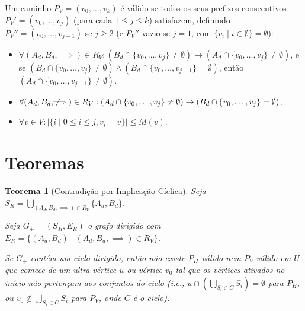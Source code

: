 \documentclass{article}
\newtheorem{theorem}{Teorema}
\begin{document}
Um caminho \( P_V = (v_0, \dots, v_k) \) é válido se todos os seus prefixos consecutivos \( P_V' = (v_0, \dots, v_j) \) (para cada \( 1 \leq j \leq k \)) satisfazem, definindo \( P_V'' = (v_0, \dots, v_{j-1}) \) se \( j \geq 2 \) (e \( P_V'' \) vazio se \( j = 1 \), com \( \{v_i \mid i \in \emptyset \} = \emptyset \)):

\begin{itemize}
    \item \( \forall (A_d, B_d, \implies) \in R_V: (B_d \cap \{v_0, \dots, v_j\} \neq \emptyset) \to (A_d \cap \{v_0, \dots, v_j\} \neq \emptyset) \), e se \( (B_d \cap \{v_0, \dots, v_j\} \neq \emptyset) \wedge (B_d \cap \{v_0, \dots, v_{j-1}\} = \emptyset) \), então \( (A_d \cap \{v_0, \dots, v_{j-1}\} \neq \emptyset) \).
    \item \( \forall (A_d, B_d, \not\!\!\!\implies) \in R_V: (A_d \cap \{v_0, \dots, v_j\} \neq \emptyset) \to (B_d \cap \{v_0, \dots, v_j\} = \emptyset) \).
    \item \( \forall v \in V: |\{ i \mid 0 \leq i \leq j, v_i = v \}| \leq M(v) \).
\end{itemize}

\section{Teoremas}

\begin{theorem}[Contradição por Implicação Cíclica]
\hfill

Seja \( S_R = \bigcup_{(A_d, B_d, \implies) \in R_V} \{ A_d, B_d \} \).

Seja \( G_{+} = (S_R, E_R) \) o grafo dirigido com \( E_R = \{ (A_d, B_d) \mid (A_d, B_d, \implies) \in R_V \} \).

Se \( G_{+} \) contém um ciclo dirigido, então não existe \( P_H \) válido nem \( P_V \) válido em \( U \) que comece de um ultra-vértice \( u \) ou vértice \( v_0 \) tal que os vértices ativados no início não pertençam aos conjuntos do ciclo (i.e., \( u \cap \left( \bigcup_{S_i \in C} S_i \right) = \emptyset \) para \( P_H \), ou \( v_0 \notin \bigcup_{S_i \in C} S_i \) para \( P_V \), onde \( C \) é o ciclo).
\end{theorem}
\end{document}
